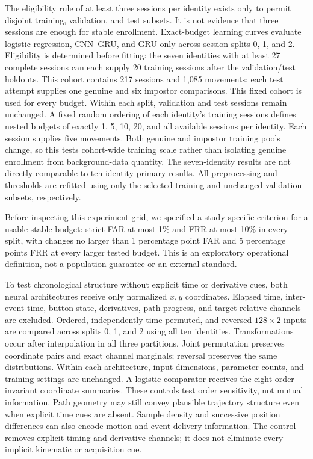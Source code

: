 \documentclass[conference]{IEEEtran}
\begin{document}
The eligibility rule of at least three sessions per identity exists only to
permit disjoint training, validation, and test subsets. It is not evidence that
three sessions are enough for stable enrollment. Exact-budget learning
curves evaluate logistic regression, CNN--GRU, and GRU-only across session splits
0, 1, and 2. Eligibility is determined before fitting: the seven identities
with at least 27 complete sessions can each supply 20 training sessions after
the validation/test holdouts. This cohort contains 217 sessions and 1,085
movements; each test attempt supplies one genuine and six impostor comparisons.
This fixed cohort is used for every budget.
Within each split, validation and test sessions remain unchanged. A fixed
random ordering of each identity's training sessions defines nested budgets
of exactly 1, 5, 10, 20, and all available sessions per identity.
Each session supplies five movements. Both
genuine and impostor training pools change, so this tests cohort-wide training
scale rather than isolating genuine enrollment from background-data quantity.
The seven-identity results are not directly comparable to ten-identity primary
results. All preprocessing and thresholds are refitted using only the selected
training and unchanged validation subsets, respectively.

Before inspecting this experiment grid, we specified a study-specific
criterion for a usable stable budget: strict FAR at most 1\% and FRR at most
10\% in every split, with changes no larger than 1 percentage point FAR and
5 percentage points FRR at every larger tested budget. This is an exploratory
operational definition, not a population guarantee or an external standard.

To test chronological structure without explicit time or derivative cues,
both neural architectures receive only normalized $x,y$ coordinates. Elapsed
time, inter-event time, button state, derivatives, path progress, and
target-relative channels are excluded. Ordered, independently time-permuted,
and reversed $128\times2$ inputs are compared across splits 0, 1, and 2 using
all ten identities. Transformations occur after interpolation in all three
partitions. Joint permutation preserves coordinate pairs and exact channel
marginals; reversal preserves the same distributions. Within each architecture,
input dimensions, parameter counts, and training settings are unchanged.
A logistic comparator receives the eight order-invariant coordinate summaries.
These controls test order sensitivity, not mutual information. Path geometry
may still convey plausible trajectory structure even when explicit time cues
are absent. Sample density and successive position differences can also
encode motion and event-delivery information. The control removes explicit
timing and derivative channels; it does not eliminate every implicit
kinematic or acquisition cue.
\end{document}
